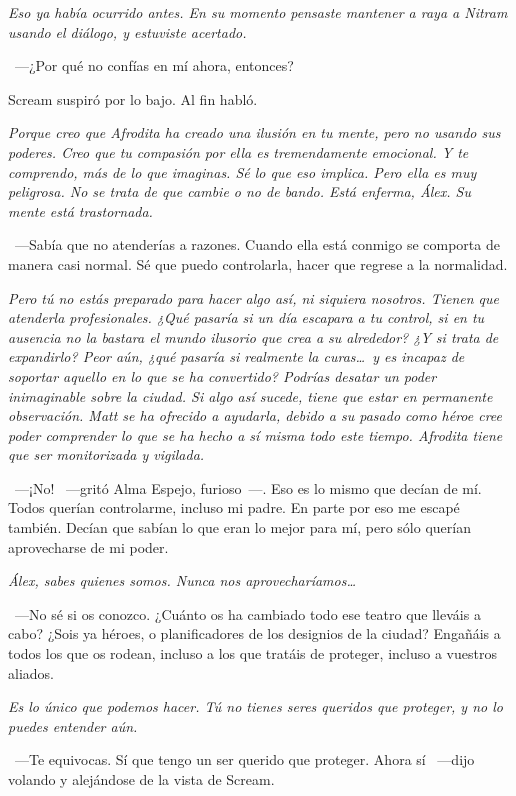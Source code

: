 \emph{Eso ya había ocurrido antes. En su momento pensaste mantener a raya a Nitram usando el diálogo, y estuviste acertado.}

~---¿Por qué no confías en mí ahora, entonces?

Scream suspiró por lo bajo. Al fin habló.

\emph{Porque creo que Afrodita ha creado una ilusión en tu mente, pero no usando sus poderes. Creo que tu compasión por ella es tremendamente emocional. Y te comprendo, más de lo que imaginas. Sé lo que eso implica. Pero ella es muy peligrosa. No se trata de que cambie o no de bando. Está enferma, Álex. Su mente está trastornada.}

~---Sabía que no atenderías a razones. Cuando ella está conmigo se comporta de manera casi normal. Sé que puedo controlarla, hacer que regrese a la normalidad.

\emph{Pero tú no estás preparado para hacer algo así, ni siquiera nosotros. Tienen que atenderla profesionales. ¿Qué pasaría si un día escapara a tu control, si en tu ausencia no la bastara el mundo ilusorio que crea a su alrededor? ¿Y si trata de expandirlo? Peor aún, ¿qué pasaría si realmente la curas\dots\ y es incapaz de soportar aquello en lo que se ha convertido? Podrías desatar un poder inimaginable sobre la ciudad. Si algo así sucede, tiene que estar en permanente observación. Matt se ha ofrecido a ayudarla, debido a su pasado como héroe cree poder comprender lo que se ha hecho a sí misma todo este tiempo. Afrodita tiene que ser monitorizada y vigilada.}

~---¡No! ~---gritó Alma Espejo, furioso~---. Eso es lo mismo que decían de mí. Todos querían controlarme, incluso mi padre. En parte por eso me escapé también. Decían que sabían lo que eran lo mejor para mí, pero sólo querían aprovecharse de mi poder.

\emph{Álex, sabes quienes somos. Nunca nos aprovecharíamos\dots}

~---No sé si os conozco. ¿Cuánto os ha cambiado todo ese teatro que lleváis a cabo? ¿Sois ya héroes, o planificadores de los designios de la ciudad? Engañáis a todos los que os rodean, incluso a los que tratáis de proteger, incluso a vuestros aliados.

\emph{Es lo único que podemos hacer. Tú no tienes seres queridos que proteger, y no lo puedes entender aún.}

~---Te equivocas. Sí que tengo un ser querido que proteger. Ahora sí ~---dijo volando y alejándose de la vista de Scream.


